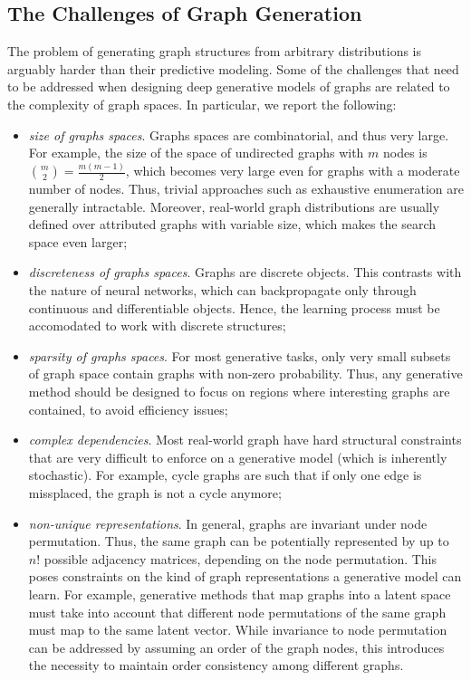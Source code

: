 \subsection{The Challenges of Graph Generation}
The problem of generating graph structures from arbitrary distributions is arguably harder than their predictive modeling. Some of the challenges that need to be addressed when designing deep generative models of graphs are related to the complexity of graph spaces. In particular, we report the following:
\begin{itemize}
    \item \emph{size of graphs spaces}. Graphs spaces are combinatorial, and thus very large. For example, the size of the space of undirected graphs with $m$ nodes is ${m \choose 2} = \frac{m(m-1)}{2}$, which becomes very large even for graphs with a moderate number of nodes. Thus, trivial approaches such as exhaustive enumeration are generally intractable. Moreover, real-world graph distributions are usually defined over attributed graphs with variable size, which makes the search space even larger;
    \item \emph{discreteness of graphs spaces}. Graphs are discrete objects. This contrasts with the nature of neural networks, which can backpropagate only through continuous and differentiable objects. Hence, the learning process must be accomodated to work with discrete structures;
    \item \emph{sparsity of graphs spaces}. For most generative tasks, only very small subsets of graph space contain graphs with non-zero probability. Thus, any generative method should be designed to focus on regions where interesting graphs are contained, to avoid efficiency issues;
    \item \emph{complex dependencies}. Most real-world graph have hard structural constraints that are very difficult to enforce on a generative model (which is inherently stochastic). For example, cycle graphs are such that if only one edge is missplaced, the graph is not a cycle anymore;
    \item \emph{non-unique representations}. In general, graphs are invariant under node permutation. Thus, the same graph can be potentially represented by up to $n!$ possible adjacency matrices, depending on the node permutation. This poses constraints on the kind of graph representations a generative model can learn. For example, generative methods that map graphs into a latent space must take into account that different node permutations of the same graph must map to the same latent vector. While invariance to node permutation can be addressed by assuming an order of the graph nodes, this introduces the necessity to maintain order consistency among different graphs.
\end{itemize}


